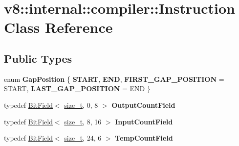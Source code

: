\hypertarget{classv8_1_1internal_1_1compiler_1_1Instruction}{}\section{v8\+:\+:internal\+:\+:compiler\+:\+:Instruction Class Reference}
\label{classv8_1_1internal_1_1compiler_1_1Instruction}
\subsection*{Public Types}
\begin{DoxyCompactItemize}
\item 
\mbox{\label{classv8_1_1internal_1_1compiler_1_1Instruction_ac16ebb6b4b65e5787eebc6ddeb3ed53a}} 
enum {\bfseries Gap\+Position} \{ {\bfseries S\+T\+A\+RT}, 
{\bfseries E\+ND}, 
{\bfseries F\+I\+R\+S\+T\+\_\+\+G\+A\+P\+\_\+\+P\+O\+S\+I\+T\+I\+ON} = S\+T\+A\+RT, 
{\bfseries L\+A\+S\+T\+\_\+\+G\+A\+P\+\_\+\+P\+O\+S\+I\+T\+I\+ON} = E\+ND
 \}
\item 
\mbox{\label{classv8_1_1internal_1_1compiler_1_1Instruction_ad7b056aedc5ce9b3c2fe5385c6633727}} 
typedef \mbox{\hyperlink{classv8_1_1internal_1_1BitField}{Bit\+Field}}$<$ \mbox{\hyperlink{classsize__t}{size\+\_\+t}}, 0, 8 $>$ {\bfseries Output\+Count\+Field}
\item 
\mbox{\label{classv8_1_1internal_1_1compiler_1_1Instruction_a541589c9df1453b674ee550f17efd83b}} 
typedef \mbox{\hyperlink{classv8_1_1internal_1_1BitField}{Bit\+Field}}$<$ \mbox{\hyperlink{classsize__t}{size\+\_\+t}}, 8, 16 $>$ {\bfseries Input\+Count\+Field}
\item 
\mbox{\label{classv8_1_1internal_1_1compiler_1_1Instruction_a4b71e02061ae1993e77fb58c8c1ecb49}} 
typedef \mbox{\hyperlink{classv8_1_1internal_1_1BitField}{Bit\+Field}}$<$ \mbox{\hyperlink{classsize__t}{size\+\_\+t}}, 24, 6 $>$ {\bfseries Temp\+Count\+Field}
\end{DoxyCompactItemize}
